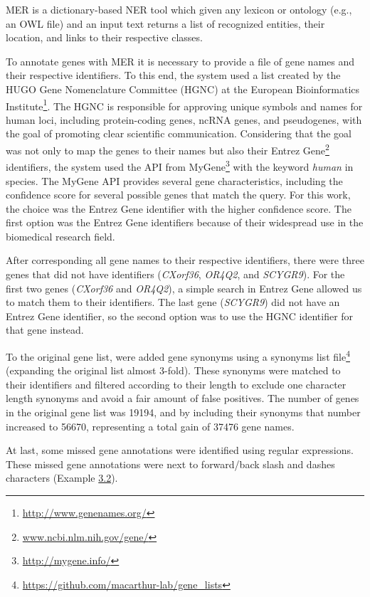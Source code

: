 MER is a dictionary-based NER tool which given any lexicon or ontology (e.g., an OWL file) and an input text returns a list of recognized entities, their location, and links to their respective classes. 

To annotate genes with MER it is necessary to provide a file of gene names and their respective identifiers. To this end, the system used a list created by the HUGO Gene Nomenclature Committee (HGNC) at the European Bioinformatics Institute\footnote{\url{http://www.genenames.org/}}. The HGNC is responsible for approving unique symbols and names for human loci, including protein-coding genes, ncRNA genes, and pseudogenes, with the goal of promoting clear scientific communication. Considering that the goal was not only to map the genes to their names but also their Entrez Gene\footnote{\url{www.ncbi.nlm.nih.gov/gene/}} identifiers, the system used the API from MyGene\footnote{\url{http://mygene.info/}} with the keyword \textit{human} in species. The MyGene API provides several gene characteristics, including the confidence score for several possible genes that match the query. For this work, the choice was the Entrez Gene identifier with the higher confidence score. The first option was the Entrez Gene identifiers because of their widespread use in the biomedical research field. 

After corresponding all gene names to their respective identifiers, there were three genes that did not have identifiers (\textit{CXorf36}, \textit{OR4Q2}, and \textit{SCYGR9}). For the first two genes (\textit{CXorf36} and \textit{OR4Q2}), a simple search in Entrez Gene allowed us to match them to their identifiers. The last gene (\textit{SCYGR9}) did not have an Entrez Gene identifier, so the second option was to use the HGNC identifier for that gene instead. 

To the original gene list, were added gene synonyms using a synonyms list file\footnote{\url{https://github.com/macarthur-lab/gene_lists}} (expanding the original list almost 3-fold). These synonyms were matched to their identifiers and filtered according to their length to exclude one character length synonyms and avoid a fair amount of false positives. The number of genes in the original gene list was 19194, and by including their synonyms that number increased to 56670, representing a total gain of 37476 gene names.

At last, some missed gene annotations were identified using regular expressions. These missed gene annotations were next to forward/back slash and dashes characters (Example \hyperlink{ex3.1}{3.2}).


